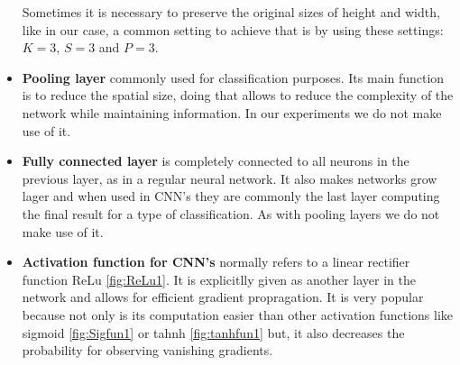 \begin{itemize}
Sometimes it is necessary to preserve the original sizes of height and width, like in our case, a common setting to achieve that is by using these settings: $K =3$, $S =3$ and $P =3$.   

\item \textbf{Pooling layer} commonly used for classification purposes. Its main function is to reduce the spatial size, doing that allows to reduce the complexity of the network while maintaining information. In our experiments we do not make use of it. \

\item \textbf{Fully connected layer} is completely connected to all neurons in the previous layer, as in a regular neural network. It also makes networks grow lager and when used in CNN's they are commonly the last layer computing the final result for a type of classification. As with pooling layers we do not make use of it. 

\item \textbf{Activation function for CNN's} normally refers to a linear rectifier function ReLu \ref{fig:ReLu1}. It is explicitlly given as another layer in the network and allows for efficient gradient propragation. It is very popular because not only is its computation easier than other activation functions like sigmoid \ref{fig:Sigfun1} or tahnh \ref{fig:tanhfun1} but, it also decreases the probability for observing vanishing gradients.

\end{itemize}

